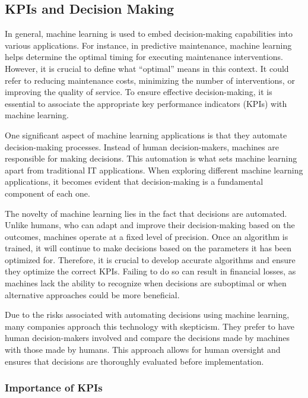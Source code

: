 \subsection{KPIs and Decision Making}

In general, machine learning is used to embed decision-making
capabilities into various applications. For instance, in predictive
maintenance, machine learning helps determine the optimal timing for
executing maintenance interventions. However, it is crucial to define
what ``optimal'' means in this context. It could refer to reducing
maintenance costs, minimizing the number of interventions, or improving
the quality of service. To ensure effective decision-making, it is
essential to associate the appropriate key performance indicators (KPIs)
with machine learning.

One significant aspect of machine learning applications is that they
automate decision-making processes. Instead of human decision-makers,
machines are responsible for making decisions. This automation is what
sets machine learning apart from traditional IT applications. When
exploring different machine learning applications, it becomes evident
that decision-making is a fundamental component of each one.

The novelty of machine learning lies in the fact that decisions are
automated. Unlike humans, who can adapt and improve their
decision-making based on the outcomes, machines operate at a fixed level
of precision. Once an algorithm is trained, it will continue to make
decisions based on the parameters it has been optimized for. Therefore,
it is crucial to develop accurate algorithms and ensure they optimize
the correct KPIs. Failing to do so can result in financial losses, as
machines lack the ability to recognize when decisions are suboptimal or
when alternative approaches could be more beneficial.

Due to the risks associated with automating decisions using machine
learning, many companies approach this technology with skepticism. They
prefer to have human decision-makers involved and compare the decisions
made by machines with those made by humans. This approach allows for
human oversight and ensures that decisions are thoroughly evaluated
before implementation.

\subsubsection{Importance of KPIs}

